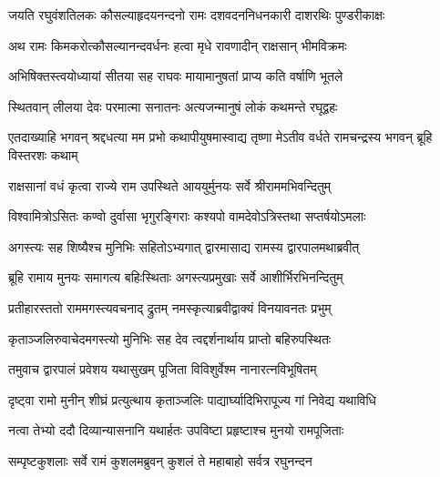 



\twolineshloka
{जयति रघुवंशतिलकः कौसल्याहृदयनन्दनो रामः}
{दशवदननिधनकारी दाशरथिः पुण्डरीकाक्षः} %


\twolineshloka
{अथ रामः किमकरोत्कौसल्यानन्दवर्धनः}
{हत्वा मृधे रावणादीन् राक्षसान् भीमविक्रमः} %

\twolineshloka
{अभिषिक्तस्त्वयोध्यायां सीतया सह राघवः}
{मायामानुषतां प्राप्य कति वर्षाणि भूतले} %

\twolineshloka
{स्थितवान् लीलया देवः परमात्मा सनातनः}
{अत्यजन्मानुषं लोकं कथमन्ते रघूद्वहः} %

\threelineshloka
{एतदाख्याहि भगवन् श्रद्दधत्या मम प्रभो}
{कथापीयुषमास्वाद्य तृष्णा मेऽतीव वर्धते}
{रामचन्द्रस्य भगवन् ब्रूहि विस्तरशः कथाम्} %


\twolineshloka
{राक्षसानां वधं कृत्वा राज्ये राम उपस्थिते}
{आययुर्मुनयः सर्वे श्रीराममभिवन्दितुम्} %

\twolineshloka
{विश्वामित्रोऽसितः कण्वो दुर्वासा भृगुरङ्गिराः}
{कश्यपो वामदेवोऽत्रिस्तथा सप्तर्षयोऽमलाः} %

\twolineshloka
{अगस्त्यः सह शिष्यैश्च मुनिभिः सहितोऽभ्यगात्}
{द्वारमासाद्य रामस्य द्वारपालमथाब्रवीत्} %

\twolineshloka
{ब्रूहि रामाय मुनयः समागत्य बहिःस्थिताः}
{अगस्त्यप्रमुखाः सर्वे आशीर्भिरभिनन्दितुम्} %

\twolineshloka
{प्रतीहारस्ततो राममगस्त्यवचनाद् द्रुतम्}
{नमस्कृत्याब्रवीद्वाक्यं विनयावनतः प्रभुम्} %

\twolineshloka
{कृताञ्जलिरुवाचेदमगस्त्यो मुनिभिः सह}
{देव त्वद्दर्शनार्थाय प्राप्तो बहिरुपस्थितः} %

\twolineshloka
{तमुवाच द्वारपालं प्रवेशय यथासुखम्}
{पूजिता विविशुर्वेश्म नानारत्नविभूषितम्} %

\twolineshloka
{दृष्ट्वा रामो मुनीन् शीघ्रं प्रत्युत्थाय कृताञ्जलिः}
{पाद्यार्घ्यादिभिरापूज्य गां निवेद्य यथाविधि} %

\twolineshloka
{नत्वा तेभ्यो ददौ दिव्यान्यासनानि यथार्हतः}
{उपविष्टा प्रहृष्टाश्च मुनयो रामपूजिताः} %

\twolineshloka
{सम्पृष्टकुशलाः सर्वे रामं कुशलमब्रुवन्}
{कुशलं ते महाबाहो सर्वत्र रघुनन्दन} %

